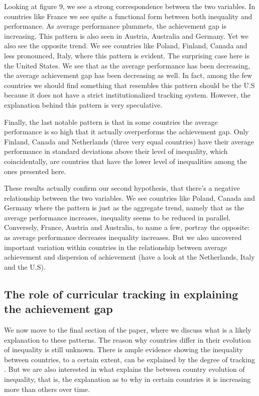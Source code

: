 \documentclass[11pt, a4paper]{article}\usepackage[]{graphicx}\usepackage[]{color}
\begin{document}
Looking at figure 9, we see a strong correspondence between the two variables. In countries like France we see quite a functional form between both inequality and performance. As average performance plummets, the achievement gap is increasing. This pattern is also seen in Austria, Australia and Germany. Yet we also see the opposite trend. We see countries like Poland, Finland, Canada and less pronounced, Italy, where this pattern is evident. The surprising case here is the United States. We see that as the average performance has been decreasing, the average achievement gap has been decreasing as well. In fact, among the few countries we should find something that resembles this pattern should be the U.S because it does not have a strict institutionalized tracking system. However, the explanation behind this pattern is very speculative.

Finally, the last notable pattern is that in some countries the average performance is so high that it actually overperforms the achievement gap. Only Finland, Canada and Netherlands (three very equal countries) have their average performance in standard deviations above their level of inequality, which coincidentally, are countries that have the lower level of inequalities among the ones presented here.

These results actually confirm our second hypothesis, that there's a negative relationship between the two variables. We see countries like Poland, Canada and Germany where the pattern is just as the aggregate trend, namely that as the average performance increases, inequality seems to be reduced in parallel. Conversely, France, Austria and Australia, to name a few, portray the opposite: as average performance decreases inequality increases. But we also uncovered important variation within countries in the relationship between average achievement and dispersion of achievement (have a look at the Netherlands, Italy and the U.S).

\subsection{The role of curricular tracking in explaining the achievement gap}











We now move to the final section of the paper, where we discuss what is a likely explanation to these patterns. The reason why countries differ in their evolution of inequality is still unknown. There is ample evidence showing the inequality between countries, to a certain extent, can be explained by the degree of tracking \citep{hanushek_woesmann_tracking}. But we are also interested in what explains the between country evolution of inequality, that is, the explanation as to why in certain countries it is increasing more than others over time.
\end{document}

